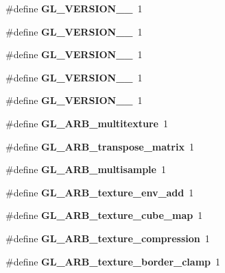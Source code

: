 \begin{DoxyCompactItemize}
\item 
\#define {\bfseries G\+L\+\_\+\+V\+E\+R\+S\+I\+O\+N\+\_\+\_}~1\label{_s_d_l__opengl_8h_a4f43b15014e1e7ab03c4ff00067c94ba}

\item 
\#define {\bfseries G\+L\+\_\+\+V\+E\+R\+S\+I\+O\+N\+\_\+\_}~1\label{_s_d_l__opengl_8h_a16a1d101bdb857b6438c8e259a67c7fe}

\item 
\#define {\bfseries G\+L\+\_\+\+V\+E\+R\+S\+I\+O\+N\+\_\+\_}~1\label{_s_d_l__opengl_8h_a22808f8ab51eb65eb5d87604cb430b08}

\item 
\#define {\bfseries G\+L\+\_\+\+V\+E\+R\+S\+I\+O\+N\+\_\+\_}~1\label{_s_d_l__opengl_8h_ae44e2c0f6bb48b28f2b2a8c35431f591}

\item 
\#define {\bfseries G\+L\+\_\+\+V\+E\+R\+S\+I\+O\+N\+\_\+\_}~1\label{_s_d_l__opengl_8h_a54343182c95193ba220e4f5c009d4811}

\item 
\#define {\bfseries G\+L\+\_\+\+A\+R\+B\+\_\+multitexture}~1\label{_s_d_l__opengl_8h_a11215f80571897a4dd62d1f9692d05fe}

\item 
\#define {\bfseries G\+L\+\_\+\+A\+R\+B\+\_\+transpose\+\_\+matrix}~1\label{_s_d_l__opengl_8h_abf78eee62efb219bc0482d423513f4da}

\item 
\#define {\bfseries G\+L\+\_\+\+A\+R\+B\+\_\+multisample}~1\label{_s_d_l__opengl_8h_ac15c9cb6992279f713d6c4384c6be874}

\item 
\#define {\bfseries G\+L\+\_\+\+A\+R\+B\+\_\+texture\+\_\+env\+\_\+add}~1\label{_s_d_l__opengl_8h_a6f7f28eee83a4d9a91bffbe037dfbc63}

\item 
\#define {\bfseries G\+L\+\_\+\+A\+R\+B\+\_\+texture\+\_\+cube\+\_\+map}~1\label{_s_d_l__opengl_8h_ae0d3bb7d2950d412da935431ac4f3af8}

\item 
\#define {\bfseries G\+L\+\_\+\+A\+R\+B\+\_\+texture\+\_\+compression}~1\label{_s_d_l__opengl_8h_a4ac5d2be61886b6fea6c113a1d60faf8}

\item 
\#define {\bfseries G\+L\+\_\+\+A\+R\+B\+\_\+texture\+\_\+border\+\_\+clamp}~1\label{_s_d_l__opengl_8h_a8fb554c539dcbc4c233693443480cea2}


\end{DoxyCompactItemize}
